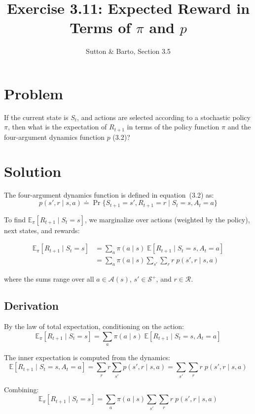 \documentclass[11pt]{article}
\title{Exercise 3.11: Expected Reward in Terms of $\pi$ and $p$}
\author{Sutton \& Barto, Section 3.5}
\date{}
\begin{document}
\maketitle

\section*{Problem}

If the current state is $S_t$, and actions are selected according to a stochastic
policy $\pi$, then what is the expectation of $R_{t+1}$ in terms of the policy
function $\pi$ and the four-argument dynamics function $p$ (3.2)?

\section*{Solution}

The four-argument dynamics function is defined in equation~(3.2) as:
\[
    p(s', r \mid s, a) \doteq \Pr\{S_{t+1} = s', R_{t+1} = r \mid S_t = s, A_t = a\}
\]

To find $\mathbb{E}_\pi[R_{t+1} \mid S_t = s]$, we marginalize over actions
(weighted by the policy), next states, and rewards:

\begin{align*}
    \mathbb{E}_\pi[R_{t+1} \mid S_t = s]
    &= \sum_{a} \pi(a \mid s) \; \mathbb{E}[R_{t+1} \mid S_t = s, A_t = a] \\[8pt]
    &= \sum_{a} \pi(a \mid s) \sum_{s'} \sum_{r} r \; p(s', r \mid s, a)
\end{align*}

where the sums range over all $a \in \mathcal{A}(s)$, $s' \in \mathcal{S}^+$,
and $r \in \mathcal{R}$.

\subsection*{Derivation}

By the law of total expectation, conditioning on the action:
\[
    \mathbb{E}_\pi[R_{t+1} \mid S_t = s]
    = \sum_{a} \pi(a \mid s) \; \mathbb{E}[R_{t+1} \mid S_t = s, A_t = a]
\]

The inner expectation is computed from the dynamics:
\[
    \mathbb{E}[R_{t+1} \mid S_t = s, A_t = a]
    = \sum_{r} r \sum_{s'} p(s', r \mid s, a)
    = \sum_{s'} \sum_{r} r \; p(s', r \mid s, a)
\]

Combining:
\[
    \boxed{\mathbb{E}_\pi[R_{t+1} \mid S_t = s]
    = \sum_{a} \pi(a \mid s) \sum_{s'} \sum_{r} r \; p(s', r \mid s, a)}
\]
\end{document}
